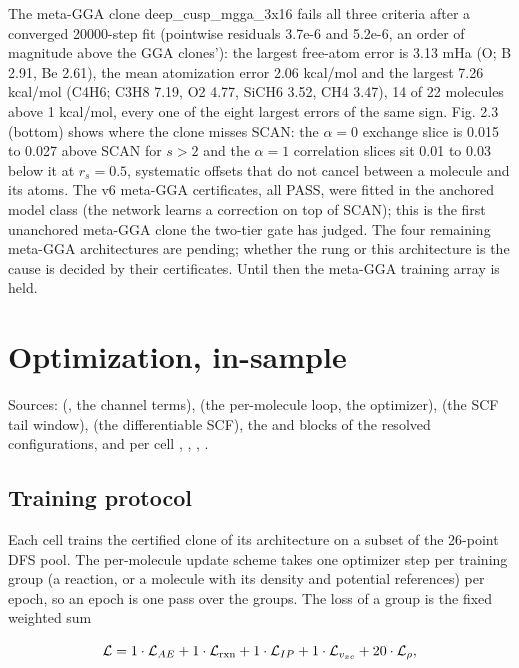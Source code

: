 \documentclass[10pt,a4paper]{article}
\begin{document}
The meta-GGA clone deep\_cusp\_mgga\_3x16 fails all three criteria after a converged 20000-step
fit (pointwise residuals 3.7e-6 and 5.2e-6, an order of magnitude above the GGA clones'): the
largest free-atom error is 3.13 mHa (O; B 2.91, Be 2.61), the mean atomization error 2.06
kcal/mol and the largest 7.26 kcal/mol (C4H6; C3H8 7.19, O2 4.77, SiCH6 3.52, CH4 3.47), 14 of
22 molecules above 1 kcal/mol, every one of the eight largest errors of the same sign. Fig. 2.3
(bottom) shows where the clone misses SCAN: the $\alpha = 0$ exchange slice is 0.015 to 0.027
above SCAN for $s > 2$ and the $\alpha = 1$ correlation slices sit 0.01 to 0.03 below it at
$r_s = 0.5$, systematic offsets that do not cancel between a molecule and its atoms. The v6
meta-GGA certificates, all PASS, were fitted in the anchored model class (the network learns a
correction on top of SCAN); this is the first unanchored meta-GGA clone the two-tier gate has
judged. The four remaining meta-GGA architectures are pending; whether the rung or this
architecture is the cause is decided by their certificates. Until then the meta-GGA training
array is held.


\section{Optimization, in-sample}

Sources:  (, the channel terms),
 (the per-molecule loop, the optimizer), 
(the SCF tail window),  (the differentiable SCF), the
 and  blocks of the resolved configurations, and per cell
, , , .

\subsection{Training protocol}

Each cell trains the certified clone of its architecture on a subset of the 26-point DFS pool.
The per-molecule update scheme takes one optimizer step per training group (a reaction, or a
molecule with its density and potential references) per epoch, so an epoch is one pass over
the groups. The loss of a group is the fixed weighted sum

\[
\mathcal{L} = 1\cdot\mathcal{L}_{AE} + 1\cdot\mathcal{L}_{\rm rxn} + 1\cdot\mathcal{L}_{IP} + 1\cdot\mathcal{L}_{v_{xc}} + 20\cdot\mathcal{L}_{\rho},
\]
\end{document}
